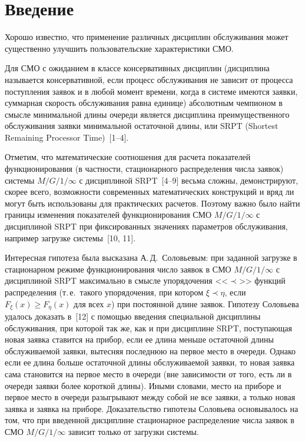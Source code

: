       \begin{multicols}{2}

      \label{st\stat}

\section{Введение}

Хорошо известно, что применение различных дисциплин
обслуживания может существенно улучшить пользовательские
характеристики СМО.

Для СМО с ожиданием в классе консервативных дисциплин
(дисциплина называется
консервативной, если процесс обслуживания не зависит от
процесса поступления заявок и в любой момент времени,
когда в системе имеются заявки, суммарная скорость
обслуживания равна единице) абсолютным чемпионом
в смысле минимальной \mbox{длины}
 очереди является дисциплина
преимущественного обслуживания заявки минимальной
остаточной длины, или SRPT (Shortest Remaining Processor
Time)~[1--4].

Отметим, что математические соотношения для расчета
показателей функционирования (в частности, стационарного
распределения числа заявок) системы $M/G/1/\infty$
с дисциплиной SRPT~[4--9] весьма сложны, демонстрируют,
скорее всего, возможности современных математических
конструкций и вряд ли могут быть использованы для
практических расчетов.
Поэтому важно было найти грани\-цы изменения
показателей функционирования СМО $M/G/1/\infty$ с
дисциплиной SRPT при фикси\-ро\-ван\-ных значениях параметров
обслуживания, например загрузке системы~[10, 11].

Интересная гипотеза была высказана А.\,Д.~Соловьевым:
при заданной загрузке в стационарном режиме функционирования
число заявок в СМО $M/G/1/\infty$ с дисциплиной SRPT
максимально в смысле упорядочения <<$\prec$>> функций
распределения (т.\,е.\ такого упорядочения, при котором
$\xi\prec\eta$, если $F_\xi(x)\ge F_\eta(x)$ для всех $x$)
при постоянной длине заявок.
Гипотезу Соловьева удалось доказать в~[12] с помощью введения
специальной дисциплины обслуживания, при которой так же,
как и при дисциплине SRPT, поступающая новая заявка
ставится на прибор, если ее длина меньше остаточной длины
обслуживаемой заявки, вытесняя последнюю на первое место в
очереди.
Однако если ее длина больше остаточной длины обслуживаемой
заявки, то новая заявка сама становится на первое место в
очереди (вне зависимости от того, есть ли в очереди заявки
более короткой длины).
Иными словами, место на приборе и первое место в очереди
разыгрывают между собой не все заявки, а только новая
заявка и заявка на приборе.
Доказательство гипотезы Соловьева основывалось на том, что
при введенной дисциплине стационарное распределение числа
заявок в СМО $M/G/1/\infty$ зависит только от загрузки
системы.


\end{multicols}
